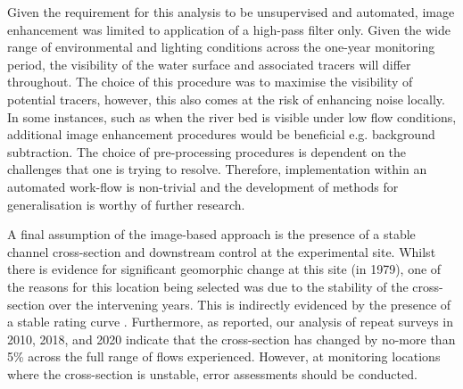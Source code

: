 \documentclass[hess, manuscript]{copernicus} %
\begin{document}
Given the requirement for this analysis to be unsupervised and automated, image enhancement was limited to application of a high-pass filter only. Given the wide range of environmental and lighting conditions across the one-year monitoring period, the visibility of the water surface and associated tracers will differ throughout. The choice of this procedure was to maximise the visibility of potential tracers, however, this also comes at the risk of enhancing noise locally. In some instances, such as when the river bed is visible under low flow conditions, additional image enhancement procedures would be beneficial e.g. background subtraction. The choice of pre-processing procedures is dependent on the challenges that one is trying to resolve. Therefore, implementation within an automated work-flow is non-trivial and the development of methods for generalisation is worthy of further research.

A final assumption of the image-based approach is the presence of a stable channel cross-section and downstream control at the experimental site. Whilst there is evidence for significant geomorphic change at this site (in 1979), one of the reasons for this location being selected was due to the stability of the cross-section over the intervening years. This is indirectly evidenced by the presence of a stable rating curve \citep{ceh2024}. Furthermore, as reported, our analysis of repeat surveys in 2010, 2018, and 2020 indicate that the cross-section has changed by no-more than 5\% across the full range of flows experienced. However, at monitoring locations where the cross-section is unstable, error assessments should be conducted.
\end{document}
